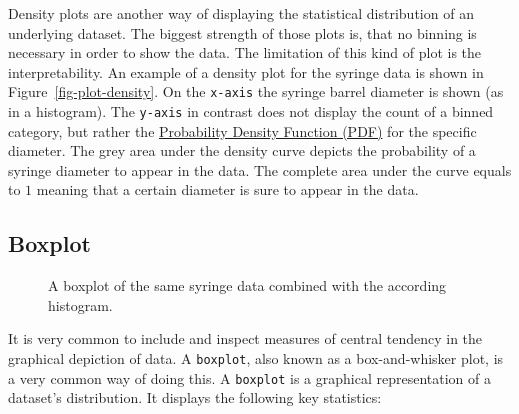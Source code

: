 \documentclass[
  a4paper,
]{scrbook}
\begin{document}
Density plots are another way of displaying the statistical distribution
of an underlying dataset. The biggest strength of those plots is, that
no binning is necessary in order to show the data. The limitation of
this kind of plot is the interpretability. An example of a density plot
for the syringe data is shown in Figure~\ref{fig-plot-density}. On the
\texttt{x-axis} the syringe barrel diameter is shown (as in a
histogram). The \texttt{y-axis} in contrast does not display the count
of a binned category, but rather the \hyperref[acronyms_PDF]{Probability
Density Function (PDF)} for the specific diameter. The grey area under
the density curve depicts the probability of a syringe diameter to
appear in the data. The complete area under the curve equals to \(1\)
meaning that a certain diameter is sure to appear in the data.

\subsection{Boxplot}\label{boxplot}

\begin{figure}[H]


\caption{\label{fig-plot-sample-003}A boxplot of the same syringe data
combined with the according histogram.}

\end{figure}%

It is very common to include and inspect measures of central tendency in
the graphical depiction of data. A \texttt{boxplot}, also known as a
box-and-whisker plot, is a very common way of doing this. A
\texttt{boxplot} is a graphical representation of a dataset's
distribution. It displays the following key statistics:
\end{document}

